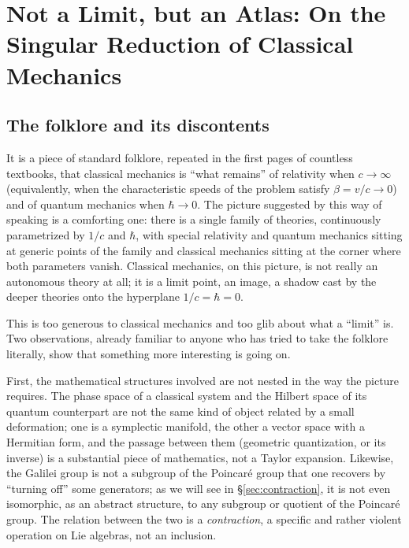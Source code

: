 \documentclass[11pt]{book}
\begin{document}
\chapter[Not a Limit, but an Atlas]{Not a Limit, but an Atlas: On the Singular Reduction of Classical Mechanics}
\label{ch:singular-limit}

\section{The folklore and its discontents}

It is a piece of standard folklore, repeated in the first pages of countless textbooks, that classical mechanics is ``what remains'' of relativity when $c\to\infty$ (equivalently, when the characteristic speeds of the problem satisfy $\beta = v/c \to 0$) and of quantum mechanics when $\hbar\to 0$. The picture suggested by this way of speaking is a comforting one: there is a single family of theories, continuously parametrized by $1/c$ and $\hbar$, with special relativity and quantum mechanics sitting at generic points of the family and classical mechanics sitting at the corner where both parameters vanish. Classical mechanics, on this picture, is not really an autonomous theory at all; it is a limit point, an image, a shadow cast by the deeper theories onto the hyperplane $1/c=\hbar=0$.

This is too generous to classical mechanics and too glib about what a ``limit'' is. Two observations, already familiar to anyone who has tried to take the folklore literally, show that something more interesting is going on.

First, the mathematical structures involved are not nested in the way the picture requires. The phase space of a classical system and the Hilbert space of its quantum counterpart are not the same kind of object related by a small deformation; one is a symplectic manifold, the other a vector space with a Hermitian form, and the passage between them (geometric quantization, or its inverse) is a substantial piece of mathematics, not a Taylor expansion. Likewise, the Galilei group is not a subgroup of the Poincar\'e group that one recovers by ``turning off'' some generators; as we will see in \S\ref{sec:contraction}, it is not even isomorphic, as an abstract structure, to any subgroup or quotient of the Poincar\'e group. The relation between the two is a \emph{contraction}, a specific and rather violent operation on Lie algebras, not an inclusion.
\end{document}
